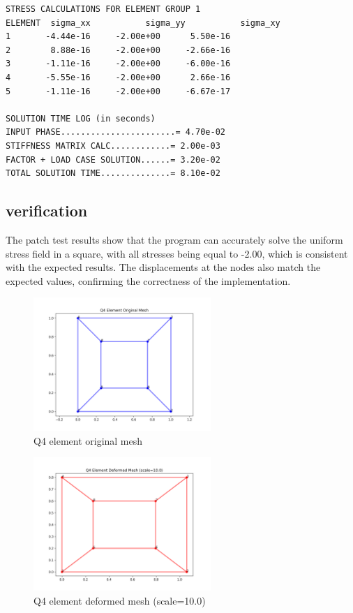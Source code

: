 \documentclass[a4paper,12pt]{report}
\begin{document}
\begin{lstlisting}[basicstyle=\ttfamily\scriptsize, frame=single, caption={patch\_test.out}]
STRESS CALCULATIONS FOR ELEMENT GROUP 1
ELEMENT  sigma_xx           sigma_yy           sigma_xy
1       -4.44e-16     -2.00e+00      5.50e-16
2        8.88e-16     -2.00e+00     -2.66e-16
3       -1.11e-16     -2.00e+00     -6.00e-16
4       -5.55e-16     -2.00e+00      2.66e-16
5       -1.11e-16     -2.00e+00     -6.67e-17

SOLUTION TIME LOG (in seconds)
INPUT PHASE.......................= 4.70e-02
STIFFNESS MATRIX CALC............= 2.00e-03
FACTOR + LOAD CASE SOLUTION......= 3.20e-02
TOTAL SOLUTION TIME..............= 8.10e-02
\end{lstlisting}
\subsection{verification}
The patch test results show that the program can accurately solve the uniform stress field in a square, with all stresses being equal to -2.00, which is consistent with the expected results. The displacements at the nodes also match the expected values, confirming the correctness of the implementation.
\begin{figure}[htbp]
    \centering
    \includegraphics[width=0.6\textwidth]{test_patch_original.png}
    \caption{Q4 element original mesh }
    \label{fig:patch_test_original}
\end{figure}
\begin{figure}[htbp]
    \centering
    \includegraphics[width=0.6\textwidth]{test_patch_deformed.png}
    \caption{Q4 element deformed mesh (scale=10.0)}
    \label{fig:patch_test_deform}
\end{figure}
\end{document}
